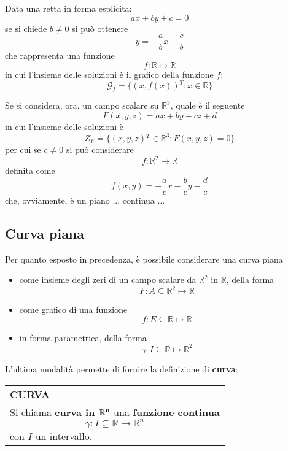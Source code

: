 \documentclass[a4paper]{extarticle}
\renewcommand\arraystretch{}
\begin{document}
\vspace{1em}
\noindent
Data una retta in forma esplicita:
\[ax + by + c = 0\]
se si chiede $b \neq 0$ si può ottenere
\[y=-\frac{a}{b} x - \frac{c}{b}\]
che rappresenta una funzione
\[f : \mathbb{R} \longmapsto \mathbb{R}\]
in cui l'insieme delle soluzioni è il grafico della funzione $f$:
\[\mathcal{G}_f = \{(x,f(x)){^T} : x \in \mathbb{R}\}\]

\vspace{1em}
\noindent
Se si considera, ora, un campo scalare su $\mathbb{R}^3$, quale è il seguente
\[F(x,y,z) = ax+by+cz+d\]
in cui l'insieme delle soluzioni è
\[Z_F = \{(x,y,z){^T} \in \mathbb{R}^3 : F(x,y,z) = 0\}\]
per cui se $c \neq 0$ si può considerare
\[f : \mathbb{R}^2 \longmapsto \mathbb{R}\]
definita come
\[f(x,y)=-\frac{a}{c} x - \frac{b}{c} y - \frac{d}{c}\]
che, ovviamente, è un piano 
... continua ...

\vspace{1em}
\noindent
\subsection{Curva piana}
Per quanto esposto in precedenza, è possibile considerare una curva piana
\begin{itemize}
    \item come insieme degli zeri di un campo scalare da $\mathbb{R}^2$ in $\mathbb{R}$, della forma
    \[F : A \subseteq \mathbb{R}^2 \longmapsto \mathbb{R}\]
    \item come grafico di una funzione
    \[f : E \subseteq \mathbb{R} \longmapsto \mathbb{R}\]
    \item in forma parametrica, della forma
    \[\gamma : I \subseteq \mathbb{R} \longmapsto \mathbb{R}^2\]
\end{itemize}
L'ultima modalità permette di fornire la definizione di \textbf{curva}:

\vspace{1em}
\setlength{\tabcolsep}{14pt}
\renewcommand{\arraystretch}{2}
\noindent
\begin{tabularx}{\textwidth}{@{}|P|@{}}
    \hline
    {\textbf{CURVA}}\\
    \parbox{\linewidth}{Si chiama \textbf{curva in $\bf{\mathbb{R}^n}$} una \textbf{funzione continua}
    \[\gamma : I \subseteq \mathbb{R} \longmapsto \mathbb{R}^n\]
    con $I$ un intervallo. \vspace{3mm}}\\
    \hline
\end{tabularx}
\end{document}
